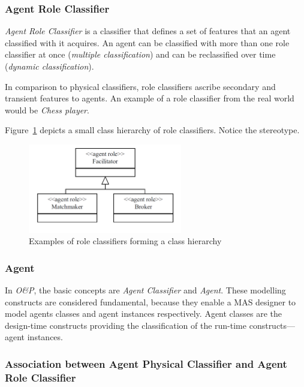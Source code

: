 \subsubsection*{Agent Role Classifier}

\textit{Agent Role Classifier} is a classifier that defines a set of features that an agent classified with it acquires.
An agent can be classified with more than one role classifier at once (\textit{multiple classification}) and can be reclassified over time (\textit{dynamic classification}).

In comparison to physical classifiers, role classifiers ascribe secondary and transient features to agents.
An example of a role classifier from the real world would be \textit{Chess player}.

Figure~\ref{figure:onp-role-classifier-examples} depicts a small class hierarchy of role classifiers.
Notice the  stereotype.

\begin{figure}[ht]
	\centering
	\includegraphics[width=0.6\textwidth]{images/onp/role-classifier-examples.png}
	\caption{Examples of role classifiers forming a class hierarchy \cite{Odell05}}
	\label{figure:onp-role-classifier-examples}
\end{figure}

\subsubsection*{Agent}

In \textit{O\&P}, the basic concepts are \textit{Agent Classifier} and \textit{Agent}.
These modelling constructs are considered fundamental, because they enable a MAS designer to model agents classes and agent instances respectively.
Agent classes are the design-time constructs providing the classification of the run-time constructs---agent instances.

\subsubsection*{Association between Agent Physical Classifier and Agent Role Classifier}

